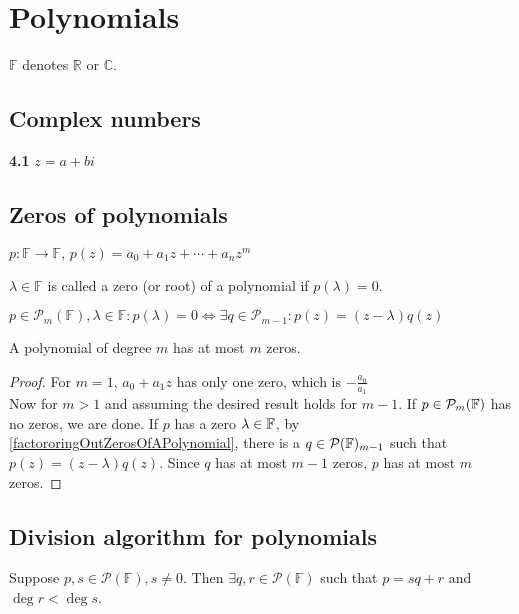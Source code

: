 \chapter{Polynomials}
$\mathbb{F}$ denotes $\mathbb{R}$ or $\mathbb{C}$.
\section{Complex numbers}

\setcounter{thm}{0}
\textbf{4.1} $z = a+bi$

\section{Zeros of polynomials}
$p: \mathbb{F} \to \mathbb{F}, \, p(z) = a_0 + a_1z + \cdots + a_n z^m$

\setcounter{thm}{4}
\begin{thm}
    $\lambda \in \mathbb{F}$ is called a zero (or root) of a polynomial if $p(\lambda) = 0$.
\end{thm}

\setcounter{thm}{5}
\begin{thm}
    \label{factororingOutZerosOfAPolynomial}
    $p \in \mathcal{P}_m(\mathbb{F}), \lambda \in \mathbb{F}: p(\lambda) = 0 \iff \exists q \in \mathcal{P}_{m-1}: p(z) = (z-\lambda)q(z)$
\end{thm}

\setcounter{thm}{7}
\begin{thm}
    A polynomial of degree $m$ has at most $m$ zeros.
\end{thm}
\begin{proof}
    For $m=1$, $a_0+a_1z$ has only one zero, which is $-\frac{a_0}{a_1}$\\
    Now for $m>1$ and assuming the desired result holds for $m-1$. If $p\in \mathcal{P}_{m}({\mathbb{F}})$ has no zeros, we are done. If $p$ has a zero $\lambda \in {\mathbb{F}}$, by \ref{factororingOutZerosOfAPolynomial}, there is a $q \in \mathcal{P}({\mathbb{F}})_{m-1}$ such that $p(z)=(z-\lambda)q(z).$ Since $q$ has at most $m-1$ zeros, $p$ has at most $m$ zeros.
\end{proof}

\section{Division algorithm for polynomials}

\setcounter{thm}{8}
\begin{thm}

    Suppose $p,s \in \mathcal{P} (\mathbb{F}), s\neq 0$. Then $\exists q,r \in \mathcal{P} (\mathbb{F})$ such that
$p=sq+r$ and $\deg r < \deg s$.
\end{thm}


